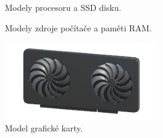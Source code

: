 \documentclass[12pt, a4paper,
twoside,        %
openright
]{report}
\begin{document}
\begin{figure}[H]
	\centering
	\qquad
	\caption{Modely procesoru a SSD disku.}
	\label{fig:components}
\end{figure}

\begin{figure}[H]
	\centering
	\qquad
	\caption{Modely zdroje počítače a paměti RAM.}
	\label{fig:components2}
\end{figure}

\begin{figure}[H]
	\centering 
	\includegraphics[width=0.6\textwidth]{image/gpu.png} 
	\caption{Model grafické karty.} 
	\label{fig:components3} 
\end{figure}
	
\end{document}
